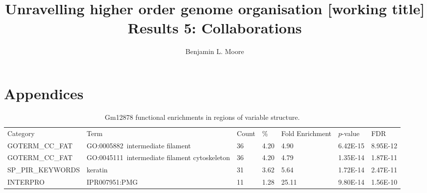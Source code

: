 \documentclass[a4paper,10pt,oneside]{book}
\title{ \vspace{3in} Unravelling higher order genome organisation {\small [working
    title]} \\ \vspace{2em} {\large {\bf Results 5: Collaborations}} }
\author{Benjamin L. Moore}
\begin{document}
\chapter{Appendices}

\setcounter{table}{0}
\makeatletter 
\renewcommand{\thetable}{A\@arabic\c@table}
\makeatother


{\scriptsize 
\begin{longtable}{lllllll}
\caption{
Gm12878 functional enrichments in regions of variable structure.
}\label{tab:gmgo}\\
\endfirsthead
Category          & Term                                          &
Count & \%   & Fold Enrichment & $p$-value   & FDR      \\
GOTERM\_CC\_FAT   & GO:0005882~intermediate filament              & 36    & 4.20 & 4.90            & 6.42E-15 & 8.95E-12 \\
GOTERM\_CC\_FAT   & GO:0045111~intermediate filament cytoskeleton & 36    & 4.20 & 4.79            & 1.35E-14 & 1.87E-11 \\
SP\_PIR\_KEYWORDS & keratin                                       & 31    & 3.62 & 5.64            & 1.72E-14 & 2.47E-11 \\
INTERPRO          & IPR007951:PMG                                 & 11    & 1.28 & 25.11           & 9.80E-14 & 1.56E-10
\end{longtable}
}

\clearpage
\end{document}
